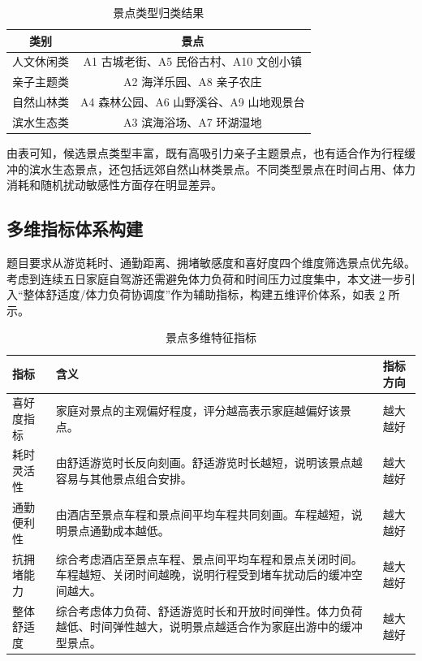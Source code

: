 \documentclass[UTF8,a4paper,12pt]{ctexart}
\begin{document}
\begin{table}[H]
\centering
\caption{景点类型归类结果}
\label{tab:type}
\begin{tabular}{cc}
\toprule
类别 & 景点 \\
\midrule
人文休闲类 & A1 古城老街、A5 民俗古村、A10 文创小镇 \\
亲子主题类 & A2 海洋乐园、A8 亲子农庄 \\
自然山林类 & A4 森林公园、A6 山野溪谷、A9 山地观景台 \\
滨水生态类 & A3 滨海浴场、A7 环湖湿地 \\
\bottomrule
\end{tabular}
\end{table}

由表可知，候选景点类型丰富，既有高吸引力亲子主题景点，也有适合作为行程缓冲的滨水生态景点，还包括远郊自然山林类景点。不同类型景点在时间占用、体力消耗和随机扰动敏感性方面存在明显差异。

\subsection{多维指标体系构建}

题目要求从游览耗时、通勤距离、拥堵敏感度和喜好度四个维度筛选景点优先级。考虑到连续五日家庭自驾游还需避免体力负荷和时间压力过度集中，本文进一步引入“整体舒适度/体力负荷协调度”作为辅助指标，构建五维评价体系，如表 \ref{tab:indicators} 所示。

\begin{table}[H]
\centering
\caption{景点多维特征指标}
\label{tab:indicators}
\begin{tabularx}{\textwidth}{p{3.0cm}X p{2.3cm}}
\toprule
指标 & 含义 & 指标方向 \\
\midrule
喜好度指标 & 家庭对景点的主观偏好程度，评分越高表示家庭越偏好该景点。 & 越大越好 \\
耗时灵活性 & 由舒适游览时长反向刻画。舒适游览时长越短，说明该景点越容易与其他景点组合安排。 & 越大越好 \\
通勤便利性 & 由酒店至景点车程和景点间平均车程共同刻画。车程越短，说明景点通勤成本越低。 & 越大越好 \\
抗拥堵能力 & 综合考虑酒店至景点车程、景点间平均车程和景点关闭时间。车程越短、关闭时间越晚，说明行程受到堵车扰动后的缓冲空间越大。 & 越大越好 \\
整体舒适度 & 综合考虑体力负荷、舒适游览时长和开放时间弹性。体力负荷越低、时间弹性越大，说明景点越适合作为家庭出游中的缓冲型景点。 & 越大越好 \\
\bottomrule
\end{tabularx}
\end{table}
\end{document}
